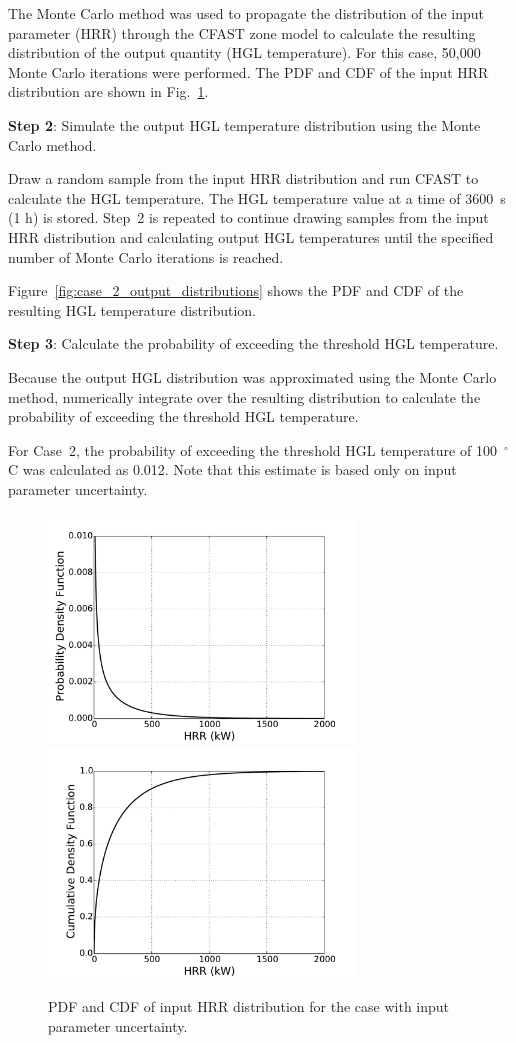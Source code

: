 \documentclass[12pt]{article}
\begin{document}
The Monte Carlo method was used to propagate the distribution of the input parameter (HRR) through the CFAST zone model to calculate the resulting distribution of the output quantity (HGL temperature). For this case, 50,000 Monte Carlo iterations were performed. The PDF and CDF of the input HRR distribution are shown in Fig.~\ref{fig:case_2_input_distributions}.

\textbf{Step 2}: Simulate the output HGL temperature distribution using the Monte Carlo method.

Draw a random sample from the input HRR distribution and run CFAST to calculate the HGL temperature. The HGL temperature value at a time of 3600~s (1 h) is stored. Step~2 is repeated to continue drawing samples from the input HRR distribution and calculating output HGL temperatures until the specified number of Monte Carlo iterations is reached.

Figure~\ref{fig:case_2_output_distributions} shows the PDF and CDF of the resulting HGL temperature distribution.

\textbf{Step 3}: Calculate the probability of exceeding the threshold HGL temperature.

Because the output HGL distribution was approximated using the Monte Carlo method, numerically integrate over the resulting distribution to calculate the probability of exceeding the threshold HGL temperature.

For Case~2, the probability of exceeding the threshold HGL temperature of 100~$^\circ$C was calculated as 0.012. Note that this estimate is based only on input parameter uncertainty.


\clearpage


\begin{figure}[p]
\includegraphics[width=3.2in]{Figures/input_PDF}
\includegraphics[width=3.2in]{Figures/input_CDF}
\caption{PDF and CDF of input HRR distribution for the case with input parameter uncertainty.}
\label{fig:case_2_input_distributions}
\end{figure}
\end{document}
